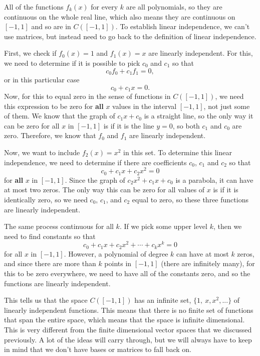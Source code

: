 \documentclass{ximera}
\begin{document}
\begin{exampleSol}
    All of the functions $f_k(x)$ for every $k$ are all polynomials, so they are continuous on the whole real line, which also means they are continuous on $[-1,1]$ and so are in $C([-1,1])$. To establish linear independence, we can't use matrices, but instead need to go back to the definition of linear independence. 
    
    First, we check if $f_0(x) = 1$ and $f_1(x) = x$ are linearly independent. For this, we need to determine if it is possible to pick $c_0$ and $c_1$ so that
    \[ 
        c_0f_0 + c_1f_1 = 0, 
    \] 
    or in this particular case 
    \[ 
        c_0 + c_1 x = 0. 
    \] 
    Now, for this to equal zero in the sense of functions in $C([-1,1])$, we need this expression to be zero for \textbf{all} $x$ values in the interval $[-1,1]$, not just some of them. We know that the graph of $c_1 x + c_0$ is a straight line, so the only way it can be zero for all $x$ in $[-1,1]$ is if it is the line $y=0$, so both $c_1$ and $c_0$ are zero. Therefore, we know that $f_0$ and $f_1$ are linearly independent. 
    
    Now, we want to include $f_2(x) = x^2$ in this set. To determine this linear independence, we need to determine if there are coefficients $c_0$, $c_1$ and $c_2$ so that
    \[ 
        c_0 + c_1 x + c_2x^2 = 0 
    \] 
    for \textbf{all} $x$ in $[-1,1]$. Since the graph of $c_2x^2 + c_1x + c_0$ is a parabola, it can have at most two zeros. The only way this can be zero for all values of $x$ is if it is identically zero, so we need $c_0$, $c_1$, and $c_2$ equal to zero, so these three functions are linearly independent. 
    
    The same process continuous for all $k$. If we pick some upper level $k$, then we need to find constants so that 
    \[ 
        c_0 + c_1x + c_2x^2 + \cdots + c_kx^k = 0
    \] 
    for all $x$ in $[-1,1]$. However, a polynomial of degree $k$ can have at most $k$ zeros, and since there are more than $k$ points in $[-1,1]$ (there are infinitely many), for this to be zero everywhere, we need to have all of the constants zero, and so the functions are linearly independent.    
\end{exampleSol}

This tells us that the space $C([-1,1])$ has an infinite set, $\{1,\ x, x^2, ... \}$ of linearly independent functions. This means that there is no finite set of functions that span the entire space, which means that the space is infinite dimensional. This is very different from the finite dimensional vector spaces that we discussed previously. A lot of the ideas will carry through, but we will always have to keep in mind that we don't have bases or matrices to fall back on. 
\end{document}
